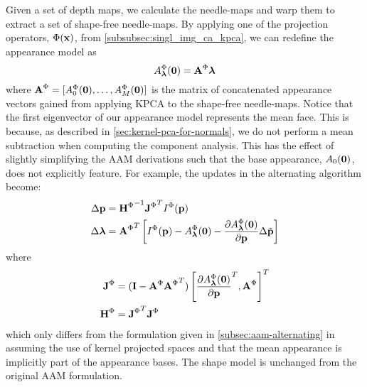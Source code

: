 Given a set of depth maps, we calculate the needle-maps and warp them to extract
a set of shape-free needle-maps. By applying one of the projection operators,
$\Phi(\boldsymbol{\mathbf{x}})$, from \cref{subsubsec:singl_img_ca_kpca}, we can
redefine the appearance model as
\begin{equation}\label{eq:aam-kernel-appearance-model}
    A_{\boldsymbol{\mathbf{\lambda}}}^{\Phi}(\boldsymbol{\mathbf{0}}) = \boldsymbol{\mathbf{A}}^{\Phi} \boldsymbol{\mathbf{\lambda}}
\end{equation}
where $\boldsymbol{\mathbf{A}}^{\Phi} = [A_0^{\Phi}(\boldsymbol{\mathbf{0}}), \ldots, A_M^{\Phi}(\boldsymbol{\mathbf{0}})]$
is the matrix of concatenated appearance vectors gained from applying KPCA to
the shape-free needle-maps. Notice that the first eigenvector of our appearance
model represents the mean face. This is because, as described in
\cref{sec:kernel-pca-for-normals}, we do not perform a mean subtraction
when computing the component analysis. This has the effect of slightly
simplifying the AAM derivations such that the base appearance, $A_0(\boldsymbol{\mathbf{0}})$,
does not explicitly feature. For example, the updates in the alternating
algorithm become:
\begin{equation}
    \begin{aligned}\label{eq:aam-kernel-alternating-update}
        \Delta \boldsymbol{\mathbf{p}}       &= {\boldsymbol{\mathbf{H}}^{\Phi}}^{-1} {\boldsymbol{\mathbf{J}}^{\Phi}}^{T} I^{\Phi}(\boldsymbol{\mathbf{p}}) \\
        \Delta \boldsymbol{\mathbf{\lambda}} &= {\boldsymbol{\mathbf{A}}^{\Phi}}^T \left[ I^{\Phi}(\boldsymbol{\mathbf{p}}) - A^{\Phi}_{\boldsymbol{\mathbf{\lambda}}}(\boldsymbol{\mathbf{0}}) - \frac{\partial A^{\Phi}_{\boldsymbol{\mathbf{\lambda}}}(\boldsymbol{\mathbf{0}})}{\partial \boldsymbol{\mathbf{p}}} \Delta \tilde{\boldsymbol{\mathbf{p}}} \right]
    \end{aligned}
\end{equation}
where 
\begin{equation*}
    \begin{aligned}
        \boldsymbol{\mathbf{J}}^{\Phi} &= (\boldsymbol{\mathbf{I}} - \boldsymbol{\mathbf{A}}^{\Phi} {\boldsymbol{\mathbf{A}}^{\Phi}}^T) \left[ {\frac{\partial A^{\Phi}_{\boldsymbol{\mathbf{\lambda}}}(\boldsymbol{\mathbf{0}})}{\partial \boldsymbol{\mathbf{p}}}}^T, \boldsymbol{\mathbf{A}}^{\Phi} \right]^T \\
        \boldsymbol{\mathbf{H}}^{\Phi} &= {\boldsymbol{\mathbf{J}}^{\Phi}}^{T} \boldsymbol{\mathbf{J}}^{\Phi}
    \end{aligned}
\end{equation*}
which only differs from the formulation given in \cref{subsec:aam-alternating} in assuming the use of kernel projected spaces and that the mean
appearance is implicitly part of the appearance bases. The shape model is
unchanged from the original AAM formulation.

